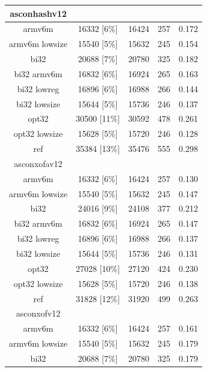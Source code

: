 \documentclass[12pt,a4paper,italian]{report}
\begin{document}
\begin{table}[h]
\begin{tabular}{|c|c|c|c|c|}
        \hline
        asconhashv12 & & & & \\
        \hline
        armv6m & 16332 [6\%] & 16424 & 257 & 0.172 \\
        \hline
        armv6m lowsize & 15540 [5\%] & 15632 & 245 & 0.154 \\
        \hline
        bi32 & 20688 [7\%] & 20780 & 325 & 0.182 \\
        \hline
        bi32 armv6m & 16832 [6\%] & 16924 & 265 & 0.163 \\
        \hline
        bi32 lowreg & 16896 [6\%] & 16988 & 266 & 0.144 \\
        \hline
        bi32 lowsize & 15644 [5\%] & 15736 & 246 & 0.137 \\
        \hline
        opt32 & 30500 [11\%] & 30592 & 478 & 0.261 \\
        \hline
        opt32 lowsize & 15628 [5\%] & 15720 & 246 & 0.128 \\
        \hline
        ref & 35384 [13\%] & 35476 & 555 & 0.298 \\
        \hline
        asconxofav12 & & & & \\
        \hline
        armv6m & 16332 [6\%] & 16424 & 257 & 0.130 \\
        \hline
        armv6m lowsize & 15540 [5\%] & 15632 & 245 & 0.147 \\
        \hline
        bi32 & 24016 [9\%] & 24108 & 377 & 0.212 \\
        \hline
        bi32 armv6m & 16832 [6\%] & 16924 & 265 & 0.147 \\
        \hline
        bi32 lowreg & 16896 [6\%] & 16988 & 266 & 0.137 \\
        \hline
        bi32 lowsize & 15644 [5\%] & 15736 & 246 & 0.131 \\
        \hline
        opt32 & 27028 [10\%] & 27120 & 424 & 0.230 \\
        \hline
        opt32 lowsize & 15628 [5\%] & 15720 & 246 & 0.138 \\
        \hline
        ref & 31828 [12\%] & 31920 & 499 & 0.263 \\
        \hline
        asconxofv12 & & & & \\
        \hline
        armv6m & 16332 [6\%] & 16424 & 257 & 0.161 \\
        \hline
        armv6m lowsize & 15540 [5\%] & 15632 & 245 & 0.179 \\
        \hline
        bi32 & 20688 [7\%] & 20780 & 325 & 0.179 \\

\end{tabular}
\end{table}
\end{document}
